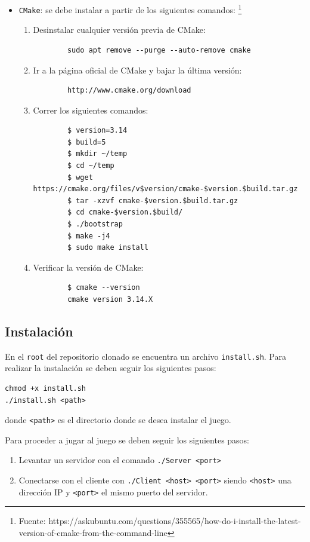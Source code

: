 \documentclass[a4paper]{article}
\begin{document}
\begin{itemize}
	\item \texttt{CMake}: se debe instalar a partir de los siguientes comandos:
	\footnote{Fuente: https://askubuntu.com/questions/355565/how-do-i-install-the-latest-version-of-cmake-from-the-command-line}
	
	\begin{enumerate}
		\item Desinstalar cualquier versión previa de CMake:
		\begin{verbatim}
		sudo apt remove --purge --auto-remove cmake
		\end{verbatim}
		\item Ir a la página oficial de CMake y bajar la última versión: 
		\begin{verbatim}
		http://www.cmake.org/download
		\end{verbatim}
		\item Correr los siguientes comandos:
		\begin{verbatim}
		$ version=3.14
		$ build=5
		$ mkdir ~/temp
		$ cd ~/temp
		$ wget https://cmake.org/files/v$version/cmake-$version.$build.tar.gz
		$ tar -xzvf cmake-$version.$build.tar.gz
		$ cd cmake-$version.$build/
		$ ./bootstrap
		$ make -j4
		$ sudo make install
		\end{verbatim}
		\item Verificar la versión de CMake:
		\begin{verbatim}
		$ cmake --version
		cmake version 3.14.X
		\end{verbatim}
	\end{enumerate}
\end{itemize}

\subsection{Instalación}
En el \texttt{root} del repositorio clonado se encuentra un archivo \texttt{install.sh}. Para realizar la instalación se deben seguir los siguientes pasos:

\begin{verbatim}
chmod +x install.sh
./install.sh <path>
\end{verbatim}
donde \texttt{<path>} es el directorio donde se desea instalar el juego.

Para proceder a jugar al juego se deben seguir los siguientes pasos:

\begin{enumerate}
	\item Levantar un servidor con el comando \texttt{./Server <port>}
	\item Conectarse con el cliente con \texttt{./Client <host> <port>} siendo \texttt{<host>} una dirección IP y \texttt{<port>} el mismo puerto del servidor.
\end{enumerate}
\end{document}
